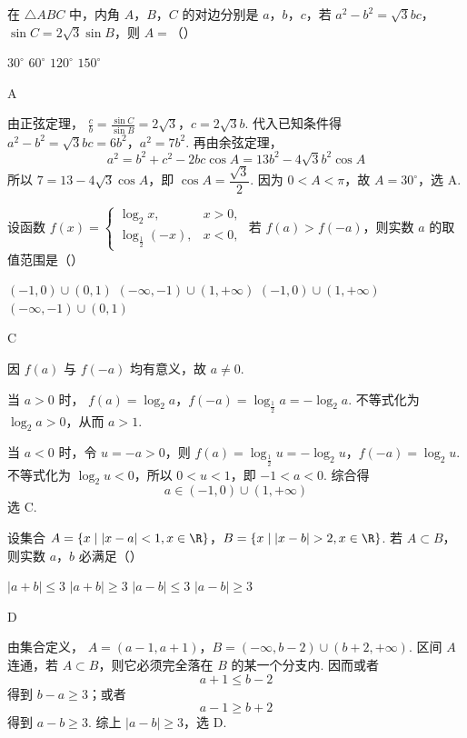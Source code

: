 \begin{problem}
在 \(\triangle ABC\) 中，内角 \(A\)，\(B\)，\(C\) 的对边分别是 \(a\)，\(b\)，\(c\)，若 \(a^2 - b^2 = \sqrt{3}bc\)，\(\sin C = 2\sqrt{3}\sin B\)，则 \(A =\)（\quad）

\choices
    {\(30^{\circ}\)}
    {\(60^{\circ}\)}
    {\(120^{\circ}\)}
    {\(150^{\circ}\)}
\begin{answer}
A
\end{answer}
\begin{solution}
由正弦定理，
\(\frac cb=\frac{\sin C}{\sin B}=2\sqrt3\)，\(c=2\sqrt3b\).
代入已知条件得
\(a^2-b^2=\sqrt3bc=6b^2\)，\(a^2=7b^2\).
再由余弦定理，
\[
a^2=b^2+c^2-2bc\cos A
=13b^2-4\sqrt3b^2\cos A
\]
所以 \(7=13-4\sqrt3\cos A\)，即 \(\cos A=\dfrac{\sqrt3}{2}\). 因为 \(0<A<\pi\)，故 \(A=30^\circ\)，选 A.
\end{solution}
\end{problem}

\begin{problem}
设函数 \( f(x) = \begin{cases}
\log_2 x, & x > 0,\\
\log_{\frac{1}{2}} (-x), & x < 0,
\end{cases} \) 若 \( f(a) > f(-a) \)，则实数 \( a \) 的取值范围是（\quad）

\choices
    {\((-1,0)\cup(0,1)\)}
    {\((-\infty,-1)\cup(1,+\infty)\)}
    {\((-1,0)\cup(1,+\infty)\)}
    {\((-\infty,-1)\cup(0,1)\)}
\begin{answer}
C
\end{answer}
\begin{solution}
因 \(f(a)\) 与 \(f(-a)\) 均有意义，故 \(a\ne0\).

当 \(a>0\) 时，
\(f(a)=\log_2a\)，\(f(-a)=\log_{\frac{1}{2}}a=-\log_2a\).
不等式化为 \(\log_2a>0\)，从而 \(a>1\).

当 \(a<0\) 时，令 \(u=-a>0\)，则
\(f(a)=\log_{\frac{1}{2}}u=-\log_2u\)，\(f(-a)=\log_2u\).
不等式化为 \(\log_2u<0\)，所以 \(0<u<1\)，即 \(-1<a<0\). 综合得
\[
a\in(-1,0)\cup(1,+\infty)
\]
选 C.
\end{solution}
\end{problem}

\begin{problem}
设集合 \(A = \{x \mid |x - a| < 1, x \in \R\}\)，\(B = \{x \mid |x - b| > 2, x \in \R\}\). 若 \(A \subset B\)，则实数 \(a\)，\(b\) 必满足（\quad）

\choices
    {\(|a + b| \leqslant 3\)}
    {\(|a + b| \geqslant 3\)}
    {\(|a - b| \leqslant 3\)}
    {\(|a - b| \geqslant 3\)}
\begin{answer}
D
\end{answer}
\begin{solution}
由集合定义，
\(A=(a-1,a+1)\)，\(B=(-\infty,b-2)\cup(b+2,+\infty)\).
区间 \(A\) 连通，若 \(A\subset B\)，则它必须完全落在 \(B\) 的某一个分支内. 因而或者
\[
a+1\le b-2
\]
得到 \(b-a\ge3\)；或者
\[
a-1\ge b+2
\]
得到 \(a-b\ge3\). 综上 \(|a-b|\ge3\)，选 D.
\end{solution}
\end{problem}

